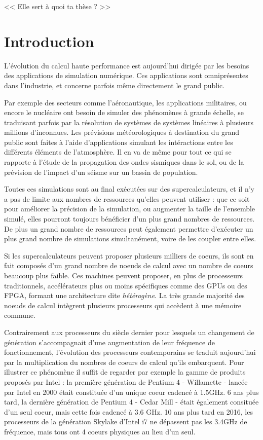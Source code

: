 \begin{savequote}[6cm]
<< Elle sert à quoi ta thèse ?  >>

\end{savequote}
\chapter{Introduction}
\chaptertoc

L'évolution du calcul haute performance est aujourd'hui dirigée par les besoins des applications de simulation numérique.
Ces applications sont omniprésentes dans l'industrie, et concerne parfois même directement le grand public.

Par exemple des secteurs comme l'aéronautique, les applications militaires, ou encore le nucléaire ont besoin de simuler des phénomènes à grande échelle, se traduisant parfois par la résolution de systèmes de systèmes linéaires à plusieurs millions d'inconnues.
Les prévisions météorologiques à destination du grand public sont faites à l'aide d'applications simulant les intéractions entre les différents éléments de l'atmosphère.
Il en va de même pour tout ce qui se rapporte à l'étude de la propagation des ondes sismiques dans le sol, ou de la prévision de l'impact d'un séisme sur un bassin de population.

Toutes ces simulations sont au final exécutées sur des supercalculateurs, et il n'y a pas de limite aux nombres de ressources qu'elles peuvent utiliser : que ce soit pour améliorer la précision de la simulation, ou augmenter la taille de l'ensemble simulé, elles pourront toujours bénéficier d'un plus grand nombres de ressources.
De plus un grand nombre de ressources peut également permettre d'exécuter un plus grand nombre de simulations simultanément, voire de les coupler entre elles.

Si les supercalculateurs peuvent proposer plusieurs milliers de coeurs, ils sont en fait composés d'un grand nombre de noeuds de calcul avec un nombre de coeurs beaucoup plus faible.
Ces machines peuvent proposer, en plus de processeurs traditionnels, accélérateurs plus ou moins spécifiques comme des GPUs ou des FPGA, formant une architecture dite \emph{hétérogène}.
La très grande majorité des noeuds de calcul intègrent plusieurs processeurs qui accèdent à une mémoire commune.

Contrairement aux processeurs du siècle dernier pour lesquels un changement de génération s'accompagnait d'une augmentation de leur fréquence de fonctionnement, l'évolution des processeurs contemporains se traduit aujourd'hui par la multiplication du nombres de coeurs de calcul qu'ils embarquent.
Pour illustrer ce phénomène il suffit de regarder par exemple la gamme de produits proposés par Intel : la première génération de Pentium 4 - Willamette - lancée par Intel en 2000 était constituée d'un unique coeur cadencé à 1.5GHz. 6 ans plus tard, la dernière génération de Pentium 4 - Cedar Mill - était également consituée d'un seul coeur, mais cette fois cadencé à 3.6 GHz. 10 ans plus tard en 2016, les processeurs de la génération Skylake d'Intel i7 ne dépassent pas les 3.4GHz de fréquence, mais tous ont 4 coeurs physiques au lieu d'un seul.

